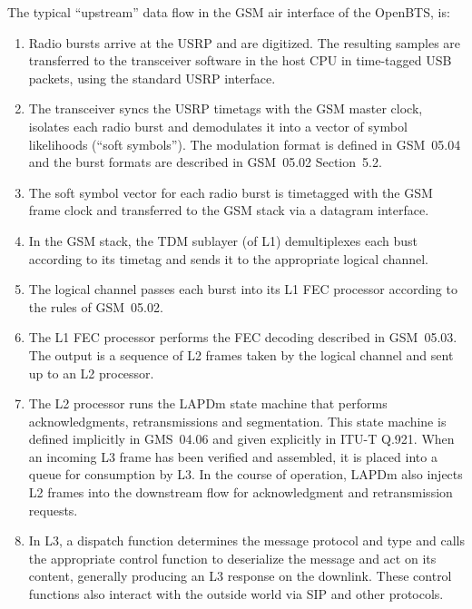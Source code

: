 \documentclass[11pt]{book}
\begin{document}
The typical ``upstream'' data flow in the GSM air interface of the OpenBTS, is:
\begin{enumerate}
	\item Radio bursts arrive at the USRP and are digitized.  The resulting samples are transferred to the transceiver software in the host CPU in time-tagged USB packets, using the standard USRP interface.
	\item The transceiver syncs the USRP timetags with the GSM master clock, isolates each radio burst and demodulates it into a vector of symbol likelihoods (``soft symbols'').  The modulation format is defined in GSM~05.04 and the burst formats are described in GSM~05.02 Section~5.2.
	\item The soft symbol vector for each radio burst is timetagged with the GSM frame clock and transferred to the GSM stack via a datagram interface.
	\item In the GSM stack, the TDM sublayer (of L1) demultiplexes each bust according to its timetag and sends it to the appropriate logical channel.
	\item The logical channel passes each burst into its L1 FEC processor according to the rules of GSM~05.02.
	\item The L1 FEC processor performs the FEC decoding described in GSM~05.03.  The output is a sequence of L2 frames taken by the logical channel and sent up to an L2 processor.
	\item The L2 processor runs the LAPDm state machine that performs acknowledgments, retransmissions and segmentation.  This state machine is defined implicitly in GMS~04.06 and given explicitly in ITU-T Q.921.  When an incoming L3 frame has been verified and assembled, it is placed into a queue for consumption by L3.  In the course of operation, LAPDm also injects L2 frames into the downstream flow for acknowledgment and retransmission requests.
	\item In L3, a dispatch function determines the message protocol and type and calls the appropriate control function to deserialize the message and act on its content, generally producing an L3 response on the downlink.  These control functions also interact with the outside world via SIP and other protocols.
\end{enumerate}
\end{document}

